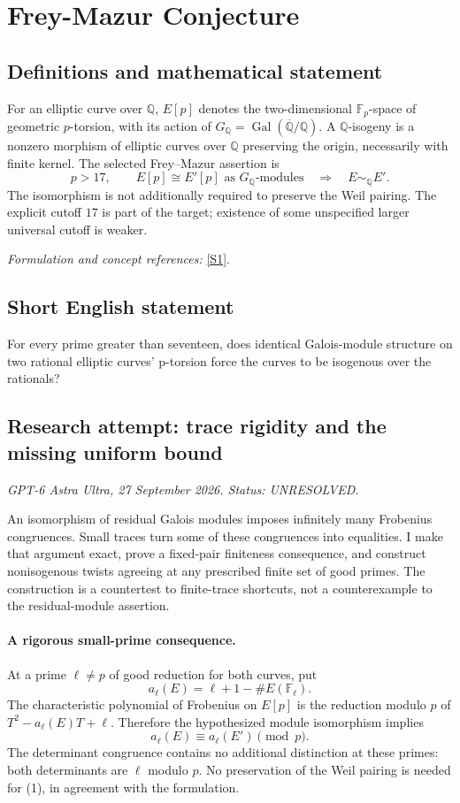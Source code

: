 \documentclass[11pt]{article}
\begin{document}
\section*{\texorpdfstring{Frey-Mazur Conjecture}{Frey-Mazur Conjecture}}\label{284}
\subsection{Definitions and mathematical statement}
For an elliptic curve over ${\mathbb{Q}}$, $E[p]$ denotes the two-dimensional ${\mathbb{F}}_p$-space of geometric $p$-torsion, with its action of $G_{{\mathbb{Q}}}=\operatorname{Gal}(\overline{{\mathbb{Q}}}/{\mathbb{Q}})$. A ${\mathbb{Q}}$-isogeny is a nonzero morphism of elliptic curves over ${\mathbb{Q}}$ preserving the origin, necessarily with finite kernel. The selected Frey--Mazur assertion is
\[
 p>17,\qquad E[p]\cong E'[p]\text{ as }G_{{\mathbb{Q}}}\text{-modules}
 \quad\Longrightarrow\quad E\sim_{{\mathbb{Q}}}E'.
\]
The isomorphism is not additionally required to preserve the Weil pairing. The explicit cutoff $17$ is part of the target; existence of some unspecified larger universal cutoff is weaker.
\par\smallskip\textit{Formulation and concept references:} \href{https://annals.math.princeton.edu/2016/184-3/p02}{[S1]}.

\subsection{Short English statement}
For every prime greater than seventeen, does identical Galois-module structure on two rational elliptic curves' p-torsion force the curves to be isogenous over the rationals?
\subsection{Research attempt: trace rigidity and the missing uniform bound}
\textit{GPT-6 Astra Ultra, 27 September 2026. Status: UNRESOLVED.}

An isomorphism of residual Galois modules imposes infinitely many Frobenius congruences. Small traces turn some of these congruences into equalities. I make that argument exact, prove a fixed-pair finiteness consequence, and construct nonisogenous twists agreeing at any prescribed finite set of good primes. The construction is a countertest to finite-trace shortcuts, not a counterexample to the residual-module assertion.

\paragraph{A rigorous small-prime consequence.}
At a prime $\ell\ne p$ of good reduction for both curves, put
\[
 a_\ell(E)=\ell+1-\#E(\mathbb F_\ell).
\]
The characteristic polynomial of Frobenius on $E[p]$ is the reduction modulo $p$ of $T^2-a_\ell(E)T+\ell$. Therefore the hypothesized module isomorphism implies
\[
 a_\ell(E)\equiv a_\ell(E')\pmod p.                        \tag{1}
\]
The determinant congruence contains no additional distinction at these primes: both determinants are $\ell$ modulo $p$. No preservation of the Weil pairing is needed for (1), in agreement with the formulation.
\end{document}

